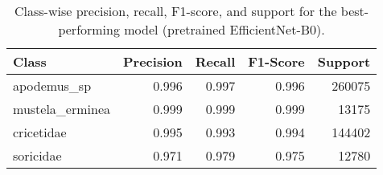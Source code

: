 \begin{table}[H]
\centering
\caption{Class-wise precision, recall, F1-score, and support for the best-performing model (pretrained EfficientNet-B0).}
\label{tab:precision_recall_fscore_support}
\begin{tabular}{l r r r r}
\toprule
Class & Precision & Recall & F1-Score & Support \\
\midrule
apodemus\_sp & 0.996 & 0.997 & 0.996 & 260075 \\
mustela\_erminea & 0.999 & 0.999 & 0.999 & 13175 \\
cricetidae & 0.995 & 0.993 & 0.994 & 144402 \\
soricidae & 0.971 & 0.979 & 0.975 & 12780 \\
\bottomrule
\end{tabular}
\end{table}